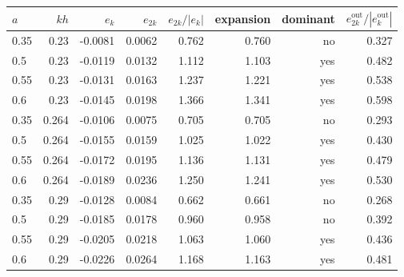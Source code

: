 \begin{tabular}{lrrrrrrr}
\toprule
$a$ & $kh$ & $e_k$ & $e_{2k}$ & $e_{2k}/|e_k|$ & expansion & dominant & $e^{\mathrm{out}}_{2k}/|e^{\mathrm{out}}_k|$ \\
\midrule
0.35 & 0.23 & -0.0081 & 0.0062 & 0.762 & 0.760 & no & 0.327 \\
0.5 & 0.23 & -0.0119 & 0.0132 & 1.112 & 1.103 & yes & 0.482 \\
0.55 & 0.23 & -0.0131 & 0.0163 & 1.237 & 1.221 & yes & 0.538 \\
0.6 & 0.23 & -0.0145 & 0.0198 & 1.366 & 1.341 & yes & 0.598 \\
0.35 & 0.264 & -0.0106 & 0.0075 & 0.705 & 0.705 & no & 0.293 \\
0.5 & 0.264 & -0.0155 & 0.0159 & 1.025 & 1.022 & yes & 0.430 \\
0.55 & 0.264 & -0.0172 & 0.0195 & 1.136 & 1.131 & yes & 0.479 \\
0.6 & 0.264 & -0.0189 & 0.0236 & 1.250 & 1.241 & yes & 0.530 \\
0.35 & 0.29 & -0.0128 & 0.0084 & 0.662 & 0.661 & no & 0.268 \\
0.5 & 0.29 & -0.0185 & 0.0178 & 0.960 & 0.958 & no & 0.392 \\
0.55 & 0.29 & -0.0205 & 0.0218 & 1.063 & 1.060 & yes & 0.436 \\
0.6 & 0.29 & -0.0226 & 0.0264 & 1.168 & 1.163 & yes & 0.481 \\
\bottomrule
\end{tabular}
